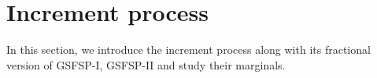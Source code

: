 \documentclass[11pt,oneside,reqno]{amsart}
\theoremstyle{definition}
\newtheorem{definition}{Definition}[section]
\theoremstyle{remarkstyle}
\begin{document}
\section{Increment process}\label{sec 6}
In this section, we introduce the increment process along with its fractional version of GSFSP-I, GSFSP-II and study their marginals.

\end{document}
